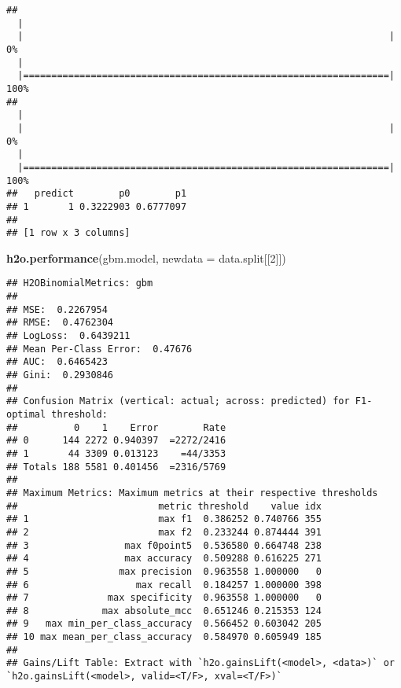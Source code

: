 \documentclass[]{article}
\newenvironment{Shaded}{\begin{snugshade}}{\end{snugshade}}
\newcommand{\KeywordTok}[1]{\textcolor[rgb]{0.13,0.29,0.53}{\textbf{{#1}}}}
\newcommand{\DataTypeTok}[1]{\textcolor[rgb]{0.13,0.29,0.53}{{#1}}}
\newcommand{\DecValTok}[1]{\textcolor[rgb]{0.00,0.00,0.81}{{#1}}}
\newcommand{\NormalTok}[1]{{#1}}
\begin{document}
\begin{verbatim}
## 
  |                                                                       
  |                                                                 |   0%
  |                                                                       
  |=================================================================| 100%
## 
  |                                                                       
  |                                                                 |   0%
  |                                                                       
  |=================================================================| 100%
##   predict        p0        p1
## 1       1 0.3222903 0.6777097
## 
## [1 row x 3 columns]
\end{verbatim}

\begin{Shaded}
\begin{Highlighting}[]
\KeywordTok{h2o.performance}\NormalTok{(gbm.model, }\DataTypeTok{newdata =} \NormalTok{data.split[[}\DecValTok{2}\NormalTok{]])}
\end{Highlighting}
\end{Shaded}

\begin{verbatim}
## H2OBinomialMetrics: gbm
## 
## MSE:  0.2267954
## RMSE:  0.4762304
## LogLoss:  0.6439211
## Mean Per-Class Error:  0.47676
## AUC:  0.6465423
## Gini:  0.2930846
## 
## Confusion Matrix (vertical: actual; across: predicted) for F1-optimal threshold:
##          0    1    Error        Rate
## 0      144 2272 0.940397  =2272/2416
## 1       44 3309 0.013123    =44/3353
## Totals 188 5581 0.401456  =2316/5769
## 
## Maximum Metrics: Maximum metrics at their respective thresholds
##                         metric threshold    value idx
## 1                       max f1  0.386252 0.740766 355
## 2                       max f2  0.233244 0.874444 391
## 3                 max f0point5  0.536580 0.664748 238
## 4                 max accuracy  0.509288 0.616225 271
## 5                max precision  0.963558 1.000000   0
## 6                   max recall  0.184257 1.000000 398
## 7              max specificity  0.963558 1.000000   0
## 8             max absolute_mcc  0.651246 0.215353 124
## 9   max min_per_class_accuracy  0.566452 0.603042 205
## 10 max mean_per_class_accuracy  0.584970 0.605949 185
## 
## Gains/Lift Table: Extract with `h2o.gainsLift(<model>, <data>)` or `h2o.gainsLift(<model>, valid=<T/F>, xval=<T/F>)`
\end{verbatim}
\end{document}

